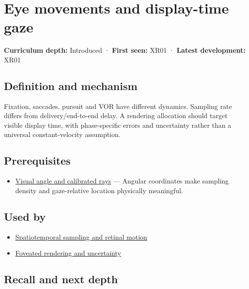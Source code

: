 \hypertarget{appendix-a6f2c4fe1996}{}
\section{Eye movements and display-time gaze}\label{appendix-a6f2c4fe1996-eye-movements-and-display-time-gaze}

\textbf{Curriculum depth:} Introduced · \textbf{First seen:} XR01 · \textbf{Latest development:} XR01

\subsection{Definition and mechanism}\label{appendix-a6f2c4fe1996-definition-and-mechanism}

Fixation, saccades, pursuit and VOR have different dynamics. Sampling rate differs from delivery/end-to-end delay. A rendering allocation should target visible display time, with phase-specific errors and uncertainty rather than a universal constant-velocity assumption.

\subsection{Prerequisites}\label{appendix-a6f2c4fe1996-prerequisites}

\begin{itemize}
\tightlist
\item
  \hyperref[appendix-7d356c396d1a]{Visual angle and calibrated rays} --- Angular coordinates make sampling density and gaze-relative location physically meaningful.
\end{itemize}

\subsection{Used by}\label{appendix-a6f2c4fe1996-used-by}

\begin{itemize}
\tightlist
\item
  \hyperref[appendix-70895739febb]{Spatiotemporal sampling and retinal motion}
\item
  \hyperref[appendix-5878b813b732]{Foveated rendering and uncertainty}
\end{itemize}

\subsection{Recall and next depth}\label{appendix-a6f2c4fe1996-recall-and-next-depth}

